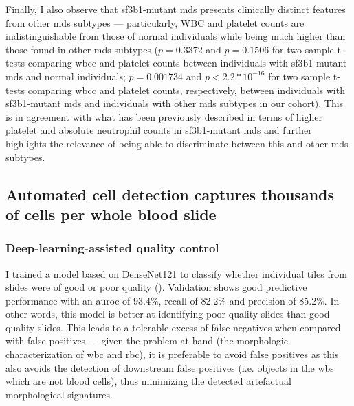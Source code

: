 \begin{figure}[!ht]
    \label{fig:mds-hb}
\end{figure}

\begin{figure}[!ht]
    \label{fig:mds-plt}
\end{figure}

Finally, I also observe that \ac{sf3b1}-mutant \ac{mds} presents clinically distinct features from other \ac{mds} subtypes --- particularly, WBC and platelet counts are indistinguishable from those of normal individuals while being much higher than those found in other \ac{mds} subtypes ($p=0.3372$ and $p=0.1506$ for two sample t-tests comparing \ac{wbcc} and platelet counts between individuals with \ac{sf3b1}-mutant \ac{mds} and normal individuals; $p=0.001734$ and $p<2.2*10^{-16}$ for two sample t-tests comparing \ac{wbcc} and platelet counts, respectively, between individuals with \ac{sf3b1}-mutant \ac{mds} and individuals with other \ac{mds} subtypes in our cohort). This is in agreement with what has been previously described in terms of higher platelet and absolute neutrophil counts in \ac{sf3b1}-mutant \ac{mds} \cite{Malcovati2015-tz,Malcovati2020-no} and further highlights the relevance of being able to discriminate between this and other \ac{mds} subtypes. 

\subsection{Automated cell detection captures thousands of cells per whole blood slide}

\subsubsection{Deep-learning-assisted quality control}

I trained a model based on DenseNet121 to classify whether individual tiles from slides were of good or poor quality (). Validation shows good predictive performance with an \ac{auroc} of 93.4\%, recall of 82.2\% and precision of 85.2\%. In other words, this model is better at identifying poor quality slides than good quality slides. This leads to a tolerable excess of false negatives when compared with false positives --- given the problem at hand (the morphologic characterization of \ac{wbc} and \ac{rbc}), it is preferable to avoid false positives as this also avoids the detection of downstream false positives (i.e. objects in the \ac{wbs} which are not blood cells), thus minimizing the detected artefactual morphological signatures.

